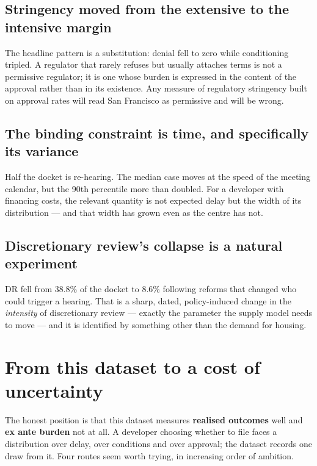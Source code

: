 \documentclass[11pt]{article}
\begin{document}
\subsection{Stringency moved from the extensive to the intensive margin}

The headline pattern is a substitution: denial fell to zero while conditioning tripled. A
regulator that rarely refuses but usually attaches terms is not a permissive regulator; it is
one whose burden is expressed in the content of the approval rather than in its existence.
Any measure of regulatory stringency built on approval rates will read San Francisco as
permissive and will be wrong.

\subsection{The binding constraint is time, and specifically its variance}

Half the docket is re-hearing. The median case moves at the speed of the meeting calendar, but
the 90th percentile more than doubled. For a developer with financing costs, the relevant
quantity is not expected delay but the width of its distribution --- and that width has grown
even as the centre has not.

\subsection{Discretionary review's collapse is a natural experiment}

DR fell from 38.8\% of the docket to 8.6\% following reforms that changed who could trigger a
hearing. That is a sharp, dated, policy-induced change in the \emph{intensity} of discretionary
review --- exactly the parameter the supply model needs to move --- and it is identified by
something other than the demand for housing.

\section{From this dataset to a cost of uncertainty}
\label{sec:uncertainty}

The honest position is that this dataset measures \textbf{realised outcomes} well and
\textbf{ex ante burden} not at all. A developer choosing whether to file faces a distribution
over delay, over conditions and over approval; the dataset records one draw from it. Four
routes seem worth trying, in increasing order of ambition.
\end{document}
